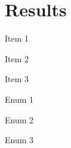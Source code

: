 \chapter{Results}\label{chap:results}

\lipsum

\begin{items}
\item Item 1
\item Item 2
\item Item 3
\end{items}

\lipsum

\begin{enum}
\item Enum 1
\item Enum 2
\item Enum 3
\end{enum}

\lipsum[1-8]
